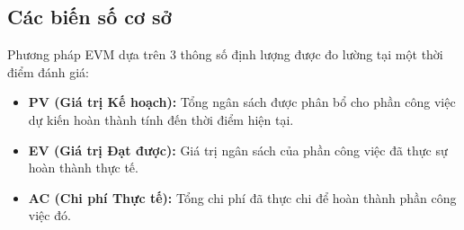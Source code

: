 \subsection{Các biến số cơ sở}
Phương pháp EVM dựa trên 3 thông số định lượng được đo lường tại một thời điểm đánh giá:
\begin{itemize}
    \item \textbf{PV (Giá trị Kế hoạch):} Tổng ngân sách được phân bổ cho phần công việc dự kiến hoàn thành tính đến thời điểm hiện tại.
    \item \textbf{EV (Giá trị Đạt được):} Giá trị ngân sách của phần công việc đã thực sự hoàn thành thực tế.
    \item \textbf{AC (Chi phí Thực tế):} Tổng chi phí đã thực chi để hoàn thành phần công việc đó.
\end{itemize}

